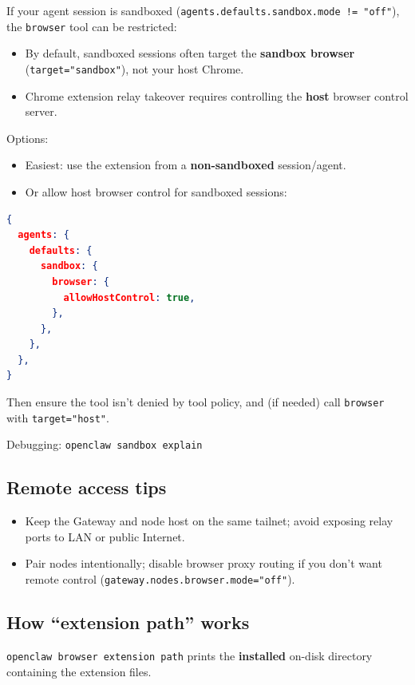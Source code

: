 If your agent session is sandboxed (\texttt{agents.defaults.sandbox.mode != "off"}), the \texttt{browser} tool can be restricted:

\begin{itemize}
  \item By default, sandboxed sessions often target the \textbf{sandbox browser} (\texttt{target="sandbox"}), not your host Chrome.
  \item Chrome extension relay takeover requires controlling the \textbf{host} browser control server.
\end{itemize}


Options:

\begin{itemize}
  \item Easiest: use the extension from a \textbf{non-sandboxed} session/agent.
  \item Or allow host browser control for sandboxed sessions:
\end{itemize}


\begin{lstlisting}[language=json]
{
  agents: {
    defaults: {
      sandbox: {
        browser: {
          allowHostControl: true,
        },
      },
    },
  },
}
\end{lstlisting}


Then ensure the tool isn’t denied by tool policy, and (if needed) call \texttt{browser} with \texttt{target="host"}.

Debugging: \texttt{openclaw sandbox explain}

\subsection{Remote access tips}


\begin{itemize}
  \item Keep the Gateway and node host on the same tailnet; avoid exposing relay ports to LAN or public Internet.
  \item Pair nodes intentionally; disable browser proxy routing if you don’t want remote control (\texttt{gateway.nodes.browser.mode="off"}).
\end{itemize}


\subsection{How “extension path” works}


\texttt{openclaw browser extension path} prints the \textbf{installed} on-disk directory containing the extension files.

